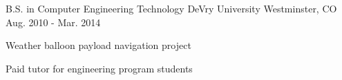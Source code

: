 

\begin{cventries}

  \cventry
    {B.S. in Computer Engineering Technology} %
    {DeVry University} %
    {Westminster, CO} %
    {Aug. 2010 - Mar. 2014} %
    {
      \begin{cvitems} %
        \item {Weather balloon payload navigation project}
        \item {Paid tutor for engineering program students}
      \end{cvitems}
    }

\end{cventries}
